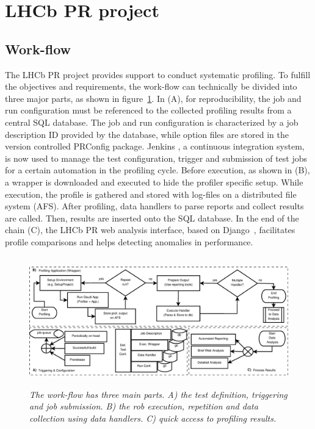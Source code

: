 \documentclass[a4paper]{jpconf}
\begin{document}
\section{LHCb PR project}
\label{sec:lhcbpr}

\subsection{Work-flow}
\label{sec:workflow}

The LHCb PR project provides support to conduct systematic profiling. To fulfill the objectives and requirements, the work-flow can technically be divided into three major parts, as shown in \mbox{figure \ref{fig:profiling_process}}. In (A), for reproducibility, the job and run configuration must be referenced to the collected profiling results from a central SQL database. The job and run configuration is characterized by a job description ID provided by the database, while option files are stored in the version controlled PRConfig package. Jenkins \cite{jenkins}, a continuous integration system, is now used to manage the test configuration, trigger and submission of test jobs for a certain automation in the profiling cycle.
\newline
Before execution, as shown in (B), a wrapper is downloaded and executed to hide the profiler specific setup. While execution, the profile is gathered and stored with log-files on a distributed file system (AFS). After profiling, data handlers to parse reports and collect results are called. Then, results are inserted onto the SQL database. In the end of the chain (C), the LHCb PR web analysis interface, based on \mbox{Django \cite{django}}, facilitates profile comparisons and helps detecting anomalies in performance.

\begin{figure}
\includegraphics[width=\textwidth, height=5.6cm]{figures/profiling_process.eps}
\caption{\small \textit{The work-flow has three main parts. A) the test definition, triggering and job submission. B) the rob execution, repetition and data collection using data handlers. C) quick access to profiling results.}}
\label{fig:profiling_process}
\end{figure}
\end{document}
